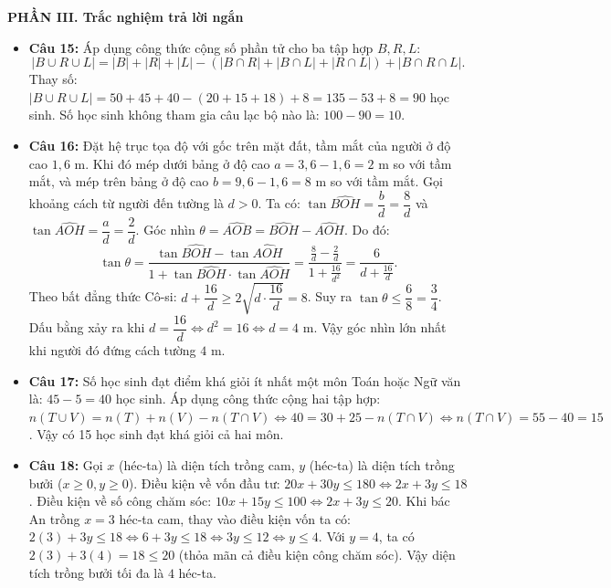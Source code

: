 \documentclass[12pt,a4paper]{article}
\begin{document}
\vspace{0.15cm}
\textbf{PHẦN III. Trắc nghiệm trả lời ngắn}
\begin{itemize}[leftmargin=0.6cm, itemsep=1.5pt, topsep=1pt]
    \item \textbf{Câu 15:} Áp dụng công thức cộng số phần tử cho ba tập hợp $B, R, L$:
    \[
    |B \cup R \cup L| = |B| + |R| + |L| - (|B \cap R| + |B \cap L| + |R \cap L|) + |B \cap R \cap L|.
    \]
    Thay số: $|B \cup R \cup L| = 50 + 45 + 40 - (20 + 15 + 18) + 8 = 135 - 53 + 8 = 90$ học sinh.
    Số học sinh không tham gia câu lạc bộ nào là: $100 - 90 = 10$.
    \item \textbf{Câu 16:} Đặt hệ trục tọa độ với gốc trên mặt đất, tầm mắt của người ở độ cao $1{,}6\text{ m}$.
    Khi đó mép dưới bảng ở độ cao $a = 3{,}6 - 1{,}6 = 2\text{ m}$ so với tầm mắt, và mép trên bảng ở độ cao $b = 9{,}6 - 1{,}6 = 8\text{ m}$ so với tầm mắt.
    Gọi khoảng cách từ người đến tường là $d > 0$. Ta có:
    $\tan \widehat{BOH} = \dfrac{b}{d} = \dfrac{8}{d}$ và $\tan \widehat{AOH} = \dfrac{a}{d} = \dfrac{2}{d}$.
    Góc nhìn $\theta = \widehat{AOB} = \widehat{BOH} - \widehat{AOH}$.
    Do đó:
    \[
    \tan \theta = \dfrac{\tan \widehat{BOH} - \tan \widehat{AOH}}{1 + \tan \widehat{BOH} \cdot \tan \widehat{AOH}} = \dfrac{\frac{8}{d} - \frac{2}{d}}{1 + \frac{16}{d^2}} = \dfrac{6}{d + \frac{16}{d}}.
    \]
    Theo bất đẳng thức Cô-si: $d + \dfrac{16}{d} \ge 2\sqrt{d \cdot \dfrac{16}{d}} = 8$.
    Suy ra $\tan \theta \le \dfrac{6}{8} = \dfrac{3}{4}$.
    Dấu bằng xảy ra khi $d = \dfrac{16}{d} \iff d^2 = 16 \iff d = 4\text{ m}$.
    Vậy góc nhìn lớn nhất khi người đó đứng cách tường $4\text{ m}$.
    \item \textbf{Câu 17:} Số học sinh đạt điểm khá giỏi ít nhất một môn Toán hoặc Ngữ văn là: $45 - 5 = 40$ học sinh.
    Áp dụng công thức cộng hai tập hợp:
    $n(T \cup V) = n(T) + n(V) - n(T \cap V) \iff 40 = 30 + 25 - n(T \cap V) \iff n(T \cap V) = 55 - 40 = 15$.
    Vậy có 15 học sinh đạt khá giỏi cả hai môn.
    \item \textbf{Câu 18:} Gọi $x$ (héc-ta) là diện tích trồng cam, $y$ (héc-ta) là diện tích trồng bưởi ($x \ge 0, y \ge 0$).
    Điều kiện về vốn đầu tư: $20x + 30y \le 180 \iff 2x + 3y \le 18$.
    Điều kiện về số công chăm sóc: $10x + 15y \le 100 \iff 2x + 3y \le 20$.
    Khi bác An trồng $x = 3$ héc-ta cam, thay vào điều kiện vốn ta có:
    $2(3) + 3y \le 18 \iff 6 + 3y \le 18 \iff 3y \le 12 \iff y \le 4$.
    Với $y = 4$, ta có $2(3) + 3(4) = 18 \le 20$ (thỏa mãn cả điều kiện công chăm sóc).
    Vậy diện tích trồng bưởi tối đa là $4$ héc-ta.
\end{itemize}
\end{document}
